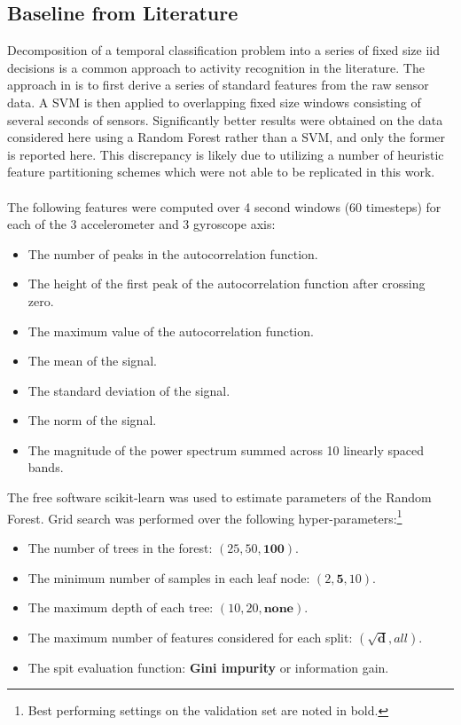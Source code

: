 \documentclass[12pt]{report}
\newcommand{\1}[0]{\mathbbm{1}}
\begin{document}
\subsection{Baseline from Literature}
Decomposition of a temporal classification problem into a series
of fixed size \ac{iid} decisions is a common approach to activity recognition
in the literature. The approach in \cite{ms-activity} is to first derive a series of
standard features from the raw sensor data. A \ac{SVM} is then applied to overlapping
fixed size windows consisting of several seconds of sensors. Significantly better results were
obtained on the data considered here using a Random Forest rather than a \ac{SVM},
and only the former is reported here. This discrepancy is likely due to \cite{ms-activity}
utilizing a number of heuristic feature partitioning schemes which were not able to be replicated in this work.
\\\\
The following features were computed over 4 second windows (60 timesteps)
for each of the 3 accelerometer and 3 gyroscope axis:
\begin{itemize}[nosep]
    \item The number of peaks in the autocorrelation function.
    \item The height of the first peak of the autocorrelation function after crossing zero.
    \item The maximum value of the autocorrelation function.
    \item The mean of the signal.
    \item The standard deviation of the signal.
    \item The norm of the signal.
    \item The magnitude of the power spectrum summed across 10 linearly spaced bands.
\end{itemize}
The free software scikit-learn \cite{scikit-learn} was used
to estimate parameters of the Random Forest. Grid search was performed
over the following hyper-parameters:\footnote{
Best performing settings on the validation set are noted in bold.
}
\begin{itemize}[nosep]
    \item The number of trees in the forest: $(25, 50, \mathbf{100})$.
    \item The minimum number of samples in each leaf node: $(2, \mathbf{5}, 10)$.
    \item The maximum depth of each tree: $(10, 20, \mathbf{none})$.
    \item The maximum number of features considered for each split: $(\mathbf{\sqrt{d}}, all)$.
    \item The spit evaluation function: \textbf{Gini impurity} or information gain.
\end{itemize}
\end{document}
